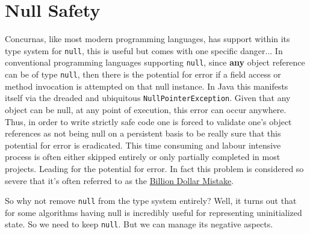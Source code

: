 \documentclass[conc-doc]{subfiles}
\begin{document}
	
	\chapter[Null Safety]{Null Safety}
	\label{ch:nullsafe}


Concurnas, like most modern programming languages, has support within its type system for \lstinline{null}, this is useful but comes with one specific danger... In conventional programming languages supporting \lstinline{null}, since \textbf{any} object reference can be of type \lstinline{null}, then there is the potential for error if a field access or method invocation is attempted on that null instance. In Java this manifests itself via the dreaded and ubiquitous \lstinline{NullPointerException}. Given that any object can be null, at any point of execution, this error can occur anywhere. Thus, in order to write strictly safe code one is forced to validate one's object references as not being null on a persistent basis to be really sure that this potential for error is eradicated. This time consuming and labour intensive process is often either skipped entirely or only partially completed in most projects. Leading for the potential for error. In fact this problem is considered so severe that it's often referred to as the \href{https://en.wikipedia.org/wiki/Tony_Hoare#Apologies_and_retractions}{Billion Dollar Mistake}.

So why not remove \lstinline{null} from the type system entirely? Well, it turns out that for some algorithms having null is incredibly useful for representing uninitialized state. So we need to keep \lstinline{null}. But we can manage its negative aspects.
\end{document}
